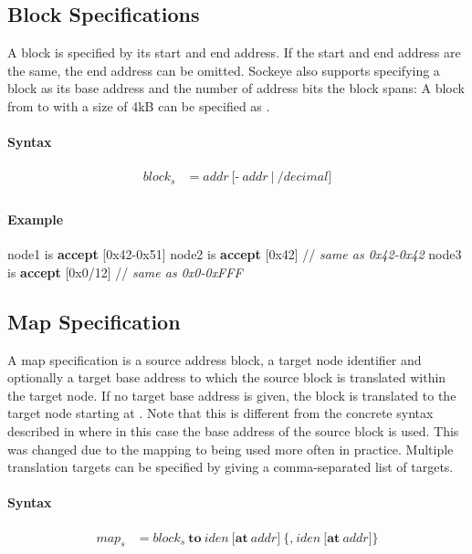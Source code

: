 \documentclass[a4paper,11pt,twoside]{report}
\begin{document}
{{{\subsection{Block Specifications}
A block is specified by its start and end address.
If the start and end address are the same, the end address can be omitted.
Sockeye also supports specifying a block as its base address and the number of address bits the block spans:
A block from  to  with a size of 4kB can be specified as .

\paragraph{Syntax}
\begin{align*}
\textit{block}_s & \mathop{=} \textit{addr}\
    \Big[
        \textbf{-}\ \textit{addr}\ 
    \Big|\
        \textbf{/}\textit{decimal}
    \Big] \\
\end{align*}

\paragraph{Example}
\begin{syntax}
    node1 is \textbf{accept} [0x42-0x51]
    node2 is \textbf{accept} [0x42]      // \textit{same as \textup{0x42-0x42}}
    node3 is \textbf{accept} [0x0/12]    // \textit{same as \textup{0x0-0xFFF}}
\end{syntax}

\subsection{Map Specification}
A map specification is a source address block, a target node identifier and optionally a target base address to which the source block is translated within the target node.
If no target base address is given, the block is translated to the target node starting at .
Note that this is different from the concrete syntax described in \cite{achermann:mars17} where in this case the base address of the source block is used.
This was changed due to the mapping to \Sockeye{0x0} being used more often in practice.
Multiple translation targets can be specified by giving a comma-separated list of targets.

\paragraph{Syntax}
\begin{align*}
\textit{map}_s & \mathop{=}
\textit{block}_s\ \textbf{to}\ \textit{iden}\ 
    \Big[
        \textbf{at}\ \textit{addr}
    \Big]\
    \Big\{
        \textbf{,}\ \textit{iden}\ 
        \Big[
            \textbf{at}\ \textit{addr}
        \Big]
    \Big\}\\
\end{align*}

}}}
\end{document}
